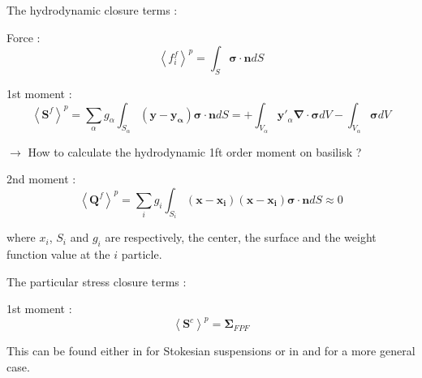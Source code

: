 \documentclass[aspectratio=169]{beamer}
\begin{document}
\begin{frame}
  {The hydrodynamic closure terms :}
  
  Force : $$\left<f_i^f\right>^p = \int_S \bm{\sigma\cdot n}dS$$
  
  1st moment : $$\left<\bm{S}^f\right>^p = \sum_\alpha g_\alpha\int_{S_\alpha} (\bm{y} - \bm{y_\alpha})\bm{\sigma\cdot n}dS =  
    + \int_{V_\alpha}\bm{y'}_\alpha \bm{\nabla} \cdot \bm{\sigma} dV- \int_{V_\alpha} \bm{\sigma} dV$$
  

  $\rightarrow$ How to calculate the hydrodynamic 1ft order moment on basilisk ?
  
  2nd moment : $$\left<\bm{Q}^f\right>^p = \sum_i g_i\int_{S_i} (\bm{x} - \bm{x_i})(\bm{x} - \bm{x_i})\bm{\sigma\cdot n}dS \approx 0$$

  where $x_i$, $S_i$ and $g_i$ are respectively, the center, the surface and the weight function value at the $i$ particle. 


\end{frame}
\begin{frame}
  {The particular stress closure terms :}

  1st moment : $$\left<\bm{S}^c\right>^p = \bm{\Sigma}_{FPF}$$

  This can be found either in \citet{nott2011suspension} for Stokesian suspensions or in \citet{zhang2021ensemble} and \citet{wang2021numerical} for a more general case.
\end{frame}
\end{document}
